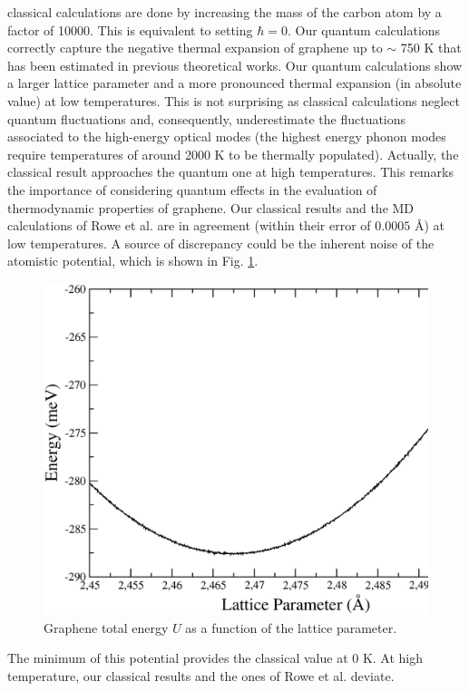 classical calculations are done by increasing the mass of the carbon atom by a factor of 10000. This is equivalent to
setting $\hbar=0$. Our quantum calculations correctly capture the negative thermal expansion of graphene up to 
$\sim$ 750 K that has been estimated in previous theoretical works\cite{rowe2018development,zakharchenko2009finite}. 
Our quantum calculations show a larger lattice parameter and a more pronounced thermal expansion (in absolute value) 
at low temperatures. This is not surprising as classical calculations neglect quantum fluctuations and, consequently, 
underestimate the fluctuations associated to the high-energy optical modes (the highest energy phonon modes require 
temperatures of around 2000 K to be thermally populated). Actually, the classical result approaches the quantum one 
at high temperatures. This remarks the importance of considering quantum effects in the evaluation of thermodynamic 
properties of graphene. Our classical results and the MD calculations of Rowe et al.\cite{rowe2018development} are 
in agreement (within their error of $0.0005$ \AA) at low temperatures. A source of discrepancy could be the 
inherent noise of the atomistic potential, which is shown in Fig. \ref{mlpotential}.
\begin{figure}[ht]
\includegraphics[width=0.99\linewidth]{Figures/elecmeV.eps}
        \caption[Graphene total energy $U$]{Graphene total energy $U$ as a function of the 
	lattice parameter.}
\label{mlpotential}
\end{figure}
The minimum of this potential provides the classical value at 0 K. At high temperature, our classical 
results and the ones of Rowe et al.\cite{rowe2018development} deviate. \\

